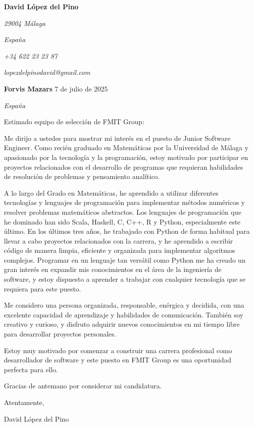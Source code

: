 \documentclass[11pt, letterpaper]{article}
\begin{document}
\begin{flushright}
    \color{gray}
    \textbf{David López del Pino}

    \vspace{-\baselineskip}
    \textsl{29004 Málaga}

    \vspace{-\baselineskip}
    \textsl{España}


    \vspace{-\baselineskip}
    \textsl{+34 622 23 23 87}

    \vspace{-\baselineskip}
    \textsl{lopezdelpinodavid@gmail.com}

\end{flushright}

\textbf{Forvis Mazars} \hfill 7 de julio de 2025

\vspace{-\baselineskip}
\textsl{España}

Estimado equipo de selección de FMIT Group:

Me dirijo a ustedes para mostrar mi interés en el puesto de Junior Software Engineer. Como recién graduado en Matemáticas por la Universidad de Málaga y apasionado por la tecnología y la programación, estoy motivado por participar en proyectos relacionados con el desarrollo de programas que requieran habilidades de resolución de problemas y pensamiento analítico.

A lo largo del Grado en Matemáticas, he aprendido a utilizar diferentes tecnologías y lenguajes de programación para implementar métodos numéricos y resolver problemas matemáticos abstractos. Los lenguajes de programación que he dominado han sido Scala, Haskell, C, C++, R y Python, especialmente este último. En los últimos tres años, he trabajado con Python de forma habitual para llevar a cabo proyectos relacionados con la carrera, y he aprendido a escribir código de manera limpia, eficiente y organizada para implementar algoritmos complejos. Programar en un lenguaje tan versátil como Python me ha creado un gran interés en expandir mis conocimientos en el área de la ingeniería de software, y estoy dispuesto a aprender a trabajar con cualquier tecnología que se requiera para este puesto.

Me considero una persona organizada, responsable, enérgica y decidida, con una excelente capacidad de aprendizaje y habilidades de comunicación. También soy creativo y curioso, y disfruto adquirir nuevos conocimientos en mi tiempo libre para desarrollar proyectos personales.

Estoy muy motivado por comenzar a construir una carrera profesional como desarrollador de software y este puesto en FMIT Group es una oportunidad perfecta para ello.

Gracias de antemano por considerar mi candidatura. 

Atentamente, 

\vspace{-\baselineskip}
David López del Pino
\end{document}
